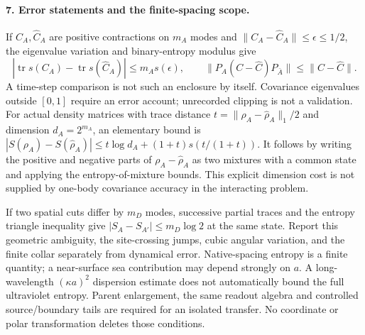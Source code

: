 \documentclass[11pt]{article}
\DeclareMathOperator{\tr}{tr}
\begin{document}
\paragraph{7. Error statements and the finite-spacing scope.}
If $C_A,\widehat C_A$ are positive contractions on $m_A$ modes
and $\|C_A-\widehat C_A\|\leq\epsilon\leq1/2$, the eigenvalue
variation and binary-entropy modulus give
\begin{equation}
 |\tr s(C_A)-\tr s(\widehat C_A)|\leq m_A s(\epsilon),\qquad
 \|P_A(C-\widehat C)P_{\bar A}\|\leq\|C-\widehat C\|.
 \tag{XP11}
\end{equation}
A time-step comparison is not such an enclosure by itself.
Covariance eigenvalues outside $[0,1]$ require an error account;
unrecorded clipping is not a validation.
For actual density matrices with trace distance
$t=\|\rho_A-\widehat\rho_A\|_1/2$ and dimension $d_A=2^{m_A}$,
an elementary bound is
$|S(\rho_A)-S(\widehat\rho_A)|
\leq t\log d_A+(1+t)s(t/(1+t))$.
It follows by writing the positive and negative parts of
$\rho_A-\widehat\rho_A$ as two mixtures with a common state
and applying the entropy-of-mixture bounds.
This explicit dimension cost is not supplied by one-body
covariance accuracy in the interacting problem.

If two spatial cuts differ by $m_D$ modes, successive partial
traces and the entropy triangle inequality give
$|S_A-S_{A'}|\leq m_D\log2$ at the same state.
Report this geometric ambiguity, the site-crossing jumps,
cubic angular variation, and the finite collar separately
from dynamical error.  Native-spacing entropy is a finite
quantity; a near-surface sea contribution may depend strongly
on $a$.  A long-wavelength $(\kappa a)^2$ dispersion estimate
does not automatically bound the full ultraviolet entropy.
Parent enlargement, the same readout algebra and controlled
source/boundary tails are required for an isolated transfer.
No coordinate or polar transformation deletes those conditions.
\end{document}
